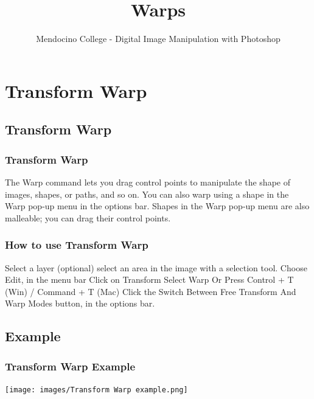 \documentclass{beamer}
\title{Warps}
\author{Mendocino College - Digital Image Manipulation with Photoshop}
\date{\vspace{-5em}}
\begin{document}
	{
		\begin{frame}
			\vspace{-35pt}
			\maketitle
		\end{frame}
	}
		
		
\section{Transform Warp}

\subsection{Transform Warp}		

	\begin{frame}
		\frametitle{Transform Warp}
		\begin{outline}
			\1 The Warp command lets you drag control points to manipulate the shape of images, shapes, or paths, and so on. You can also warp using a shape in the Warp pop‑up menu in the options bar. 
			\1 Shapes in the Warp pop‑up menu are also malleable; you can drag their control points.
		\end{outline}
	\end{frame}

	\begin{frame}
	\frametitle{How to use Transform Warp}
	\begin{outline}
		\1 Select a layer 
		\2 (optional) select an area in the image with a selection tool.  
		\1 Choose Edit, in the menu bar
		\2 Click on Transform 
		\2 Select Warp 
		\1 Or Press Control + T (Win) / Command + T (Mac) 
		\2 Click the Switch Between Free Transform And Warp Modes button, in the options bar.
	\end{outline}
\end{frame}

\subsection{Example}		
	\begin{frame}
		\frametitle{Transform Warp Example}
		\begin{center}
			\texttt{[image: images/Transform Warp example.png]}
		\end{center}
	\end{frame}
\end{document}
